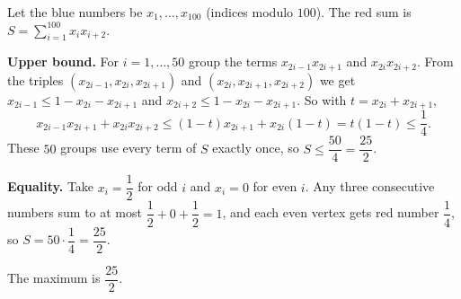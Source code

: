 Let the blue numbers be $x_1,\dots,x_{100}$ (indices modulo $100$). The red sum is $S=\sum_{i=1}^{100}x_ix_{i+2}$.

\textbf{Upper bound.} For $i=1,\dots,50$ group the terms $x_{2i-1}x_{2i+1}$ and $x_{2i}x_{2i+2}$. From the triples $(x_{2i-1},x_{2i},x_{2i+1})$ and $(x_{2i},x_{2i+1},x_{2i+2})$ we get $x_{2i-1}\le1-x_{2i}-x_{2i+1}$ and $x_{2i+2}\le1-x_{2i}-x_{2i+1}$. So with $t=x_{2i}+x_{2i+1}$,
\[
x_{2i-1}x_{2i+1}+x_{2i}x_{2i+2}\le(1-t)x_{2i+1}+x_{2i}(1-t)=t(1-t)\le\dfrac{1}{4} .
\]
These $50$ groups use every term of $S$ exactly once, so $S\le\dfrac{50}{4}=\dfrac{25}{2}$.

\textbf{Equality.} Take $x_i=\dfrac{1}{2}$ for odd $i$ and $x_i=0$ for even $i$. Any three consecutive numbers sum to at most $\dfrac{1}{2}+0+\dfrac{1}{2}=1$, and each even vertex gets red number $\dfrac{1}{4}$, so $S=50\cdot\dfrac{1}{4}=\dfrac{25}{2}$.

The maximum is $\boxed{\dfrac{25}{2}}$.
